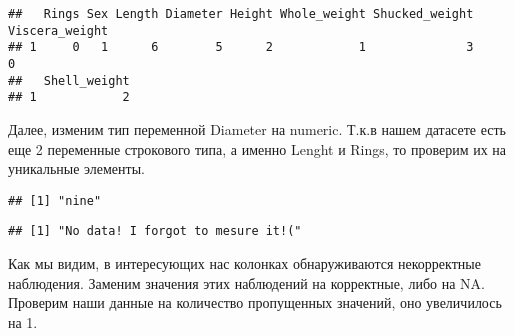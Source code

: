 \documentclass[]{article}
\newenvironment{Shaded}{\begin{snugshade}}{\end{snugshade}}
\newcommand{\CommentTok}[1]{\textcolor[rgb]{0.56,0.35,0.01}{\textit{#1}}}
\newcommand{\DataTypeTok}[1]{\textcolor[rgb]{0.13,0.29,0.53}{#1}}
\newcommand{\DecValTok}[1]{\textcolor[rgb]{0.00,0.00,0.81}{#1}}
\newcommand{\KeywordTok}[1]{\textcolor[rgb]{0.13,0.29,0.53}{\textbf{#1}}}
\newcommand{\NormalTok}[1]{#1}
\newcommand{\OperatorTok}[1]{\textcolor[rgb]{0.81,0.36,0.00}{\textbf{#1}}}
\newcommand{\OtherTok}[1]{\textcolor[rgb]{0.56,0.35,0.01}{#1}}
\newcommand{\StringTok}[1]{\textcolor[rgb]{0.31,0.60,0.02}{#1}}
\begin{document}
\begin{Shaded}
\end{Shaded}

\begin{verbatim}
##   Rings Sex Length Diameter Height Whole_weight Shucked_weight Viscera_weight
## 1     0   1      6        5      2            1              3              0
##   Shell_weight
## 1            2
\end{verbatim}

Далее, изменим тип переменной Diameter на numeric. Т.к.в нашем датасете
есть еще 2 переменные строкового типа, а именно Lenght и Rings, то
проверим их на уникальные элементы.

\begin{Shaded}
\end{Shaded}

\begin{verbatim}
## [1] "nine"
\end{verbatim}

\begin{Shaded}
\end{Shaded}

\begin{verbatim}
## [1] "No data! I forgot to mesure it!("
\end{verbatim}

Как мы видим, в интересующих нас колонках обнаруживаются некорректные
наблюдения. Заменим значения этих наблюдений на корректные, либо на NA.
Проверим наши данные на количество пропущенных значений, оно увеличилось
на 1.
\end{document}

